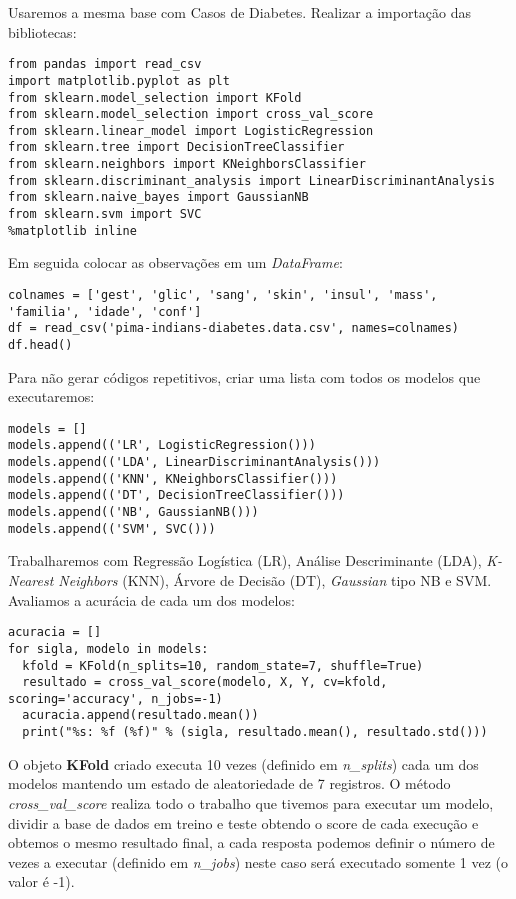Usaremos a mesma base com Casos de Diabetes. Realizar a importação das bibliotecas:
\begin{lstlisting}[]
from pandas import read_csv
import matplotlib.pyplot as plt
from sklearn.model_selection import KFold
from sklearn.model_selection import cross_val_score
from sklearn.linear_model import LogisticRegression
from sklearn.tree import DecisionTreeClassifier
from sklearn.neighbors import KNeighborsClassifier
from sklearn.discriminant_analysis import LinearDiscriminantAnalysis
from sklearn.naive_bayes import GaussianNB
from sklearn.svm import SVC
%matplotlib inline
\end{lstlisting}

Em seguida colocar as observações em um \textit{DataFrame}:
\begin{lstlisting}[]
colnames = ['gest', 'glic', 'sang', 'skin', 'insul', 'mass', 'familia', 'idade', 'conf']
df = read_csv('pima-indians-diabetes.data.csv', names=colnames)
df.head()
\end{lstlisting}

Para não gerar códigos repetitivos, criar uma lista com todos os modelos que executaremos:
\begin{lstlisting}[]
models = []
models.append(('LR', LogisticRegression()))
models.append(('LDA', LinearDiscriminantAnalysis()))
models.append(('KNN', KNeighborsClassifier()))
models.append(('DT', DecisionTreeClassifier()))
models.append(('NB', GaussianNB()))
models.append(('SVM', SVC()))
\end{lstlisting}

Trabalharemos com Regressão Logística (LR), Análise Descriminante (LDA), \textit{K-Nearest Neighbors} (KNN), Árvore de Decisão (DT), \textit{Gaussian} tipo NB e SVM. Avaliamos a acurácia de cada um dos modelos:
\begin{lstlisting}[]
acuracia = []
for sigla, modelo in models:
  kfold = KFold(n_splits=10, random_state=7, shuffle=True)
  resultado = cross_val_score(modelo, X, Y, cv=kfold, scoring='accuracy', n_jobs=-1)
  acuracia.append(resultado.mean())
  print("%s: %f (%f)" % (sigla, resultado.mean(), resultado.std())) 
\end{lstlisting}

O objeto \textbf{KFold} criado executa 10 vezes (definido em \textit{n\_splits}) cada um dos modelos mantendo um estado de aleatoriedade de 7 registros. O método \textit{cross\_val\_score} realiza todo o trabalho que tivemos para executar um modelo, dividir a base de dados em treino e teste obtendo o score de cada execução e obtemos o mesmo resultado final, a cada resposta podemos definir o número de vezes a executar (definido em \textit{n\_jobs}) neste caso será executado somente 1 vez (o valor é -1).

